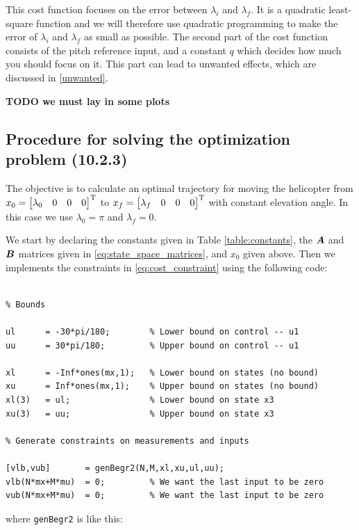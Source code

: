 This cost function focuses on the error between $\lambda_i$ and $\lambda_f$.
It is a  quadratic least-square function and we will therefore use quadratic programming to make the error of $\lambda_i$ and $\lambda_f$ as small as possible.  
The second part of the cost function consists of the pitch reference input, and a constant $q$ which decides how much you should focus on it. This part can lead to unwanted effects, which are discussed in \ref{unwanted}.

\textbf{TODO we must lay in some plots}

\subsection{Procedure for solving the optimization problem (10.2.3)} \label{optimalProcedure}

The objective is to calculate an optimal trajectory for moving the helicopter from $x_0 = \begin{bmatrix} \lambda_0 & 0 & 0 & 0 \end{bmatrix} ^{\text{T}}$ to $x_f = \begin{bmatrix} \lambda_f & 0 & 0 & 0 \end{bmatrix} ^{\text{T}}$ with constant elevation angle. In this case we use $\lambda_0 = \pi$ and $\lambda_f = 0$.

We start by declaring the constants given in Table \ref{table:constants}, the $\bm{A}$ and $\bm{B}$ matrices given in \eqref{eq:state_space_matrices}, and $x_0$ given above. Then we implements the constraints in \eqref{eq:cost_constraint} using the following code:

\begin{lstlisting}

% Bounds

ul 	    = -30*pi/180;        % Lower bound on control -- u1
uu 	    = 30*pi/180;         % Upper bound on control -- u1

xl      = -Inf*ones(mx,1);   % Lower bound on states (no bound)
xu      = Inf*ones(mx,1);    % Upper bound on states (no bound)
xl(3)   = ul;                % Lower bound on state x3
xu(3)   = uu;                % Upper bound on state x3

% Generate constraints on measurements and inputs

[vlb,vub]       = genBegr2(N,M,xl,xu,ul,uu);
vlb(N*mx+M*mu)  = 0;         % We want the last input to be zero
vub(N*mx+M*mu)  = 0;         % We want the last input to be zero

\end{lstlisting}
where \texttt{genBegr2} is like this:

